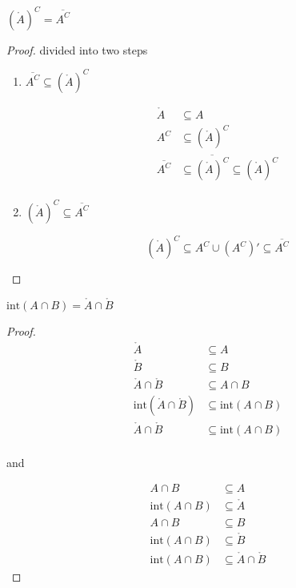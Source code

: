 \documentclass[11pt,a4paper]{book}
\begin{document}
\begin{lem}
    $(\mathring{A})^C = \overline{A^C}$
\end{lem}

\begin{proof}

divided into two steps

    \begin{enumerate}
        \item $\overline{A^C} \subseteq (\mathring{A})^C $

        \begin{align*}
            \mathring{A} &\subseteq A \\
            A^C & \subseteq (\mathring{A})^C \\
            \overline{A^C} & \subseteq \overline{(\mathring{A})^C} \subseteq (\mathring{A})^C \\
        \end{align*}

        \item $(\mathring{A})^C \subseteq \overline{A^C}$

        \[
            (\mathring{A})^C \subseteq A^C \cup (A^C)' \subseteq \overline{A^C}
        \]
    \end{enumerate}
\end{proof}

\begin{lem}
    $\text{int}{(A \cap B)} = \mathring{A} \cap \mathring{B}$

\end{lem}

\begin{proof}

\begin{align*}
    \mathring{A} &\subseteq A \\
    \mathring{B} &\subseteq B \\
    \mathring{A} \cap \mathring{B} & \subseteq A \cap B \\
    \text{int}(\mathring{A} \cap \mathring{B}) & \subseteq \text{int}(A \cap B) \\
    \mathring{A} \cap \mathring{B} & \subseteq \text{int}(A \cap B) \\
\end{align*}

and

\begin{align*}
    A \cap B &\subseteq A \\
    \text{int}(A \cap B) &\subseteq \mathring{A} \\
    A \cap B &\subseteq B \\
    \text{int}(A \cap B) &\subseteq \mathring{B} \\
\text{int}(A \cap B) & \subseteq \mathring{A} \cap \mathring{B}
\end{align*}

\end{proof}
\end{document}
